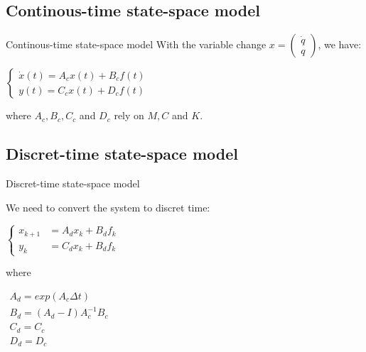 \documentclass{beamer}
\begin{document}
\subsection{Continous-time state-space model}
\begin{frame}{Continous-time state-space model}
With the variable change $x =
\begin{pmatrix}
\dot{q} \\
q
\end{pmatrix}$, we have:


\begin{center}
$\left\{
\begin{array}{ll}
\dot{x}(t) = A_cx(t) + B_cf(t) \\
y(t) = C_cx(t) + D_cf(t)
\end{array}
\right.$
\end{center}

where $A_c, B_c, C_c$ and $D_c$ rely on $M, C$ and $K$.

\end{frame}

\subsection{Discret-time state-space model}
\begin{frame}{Discret-time state-space model}

We need to convert the system to discret time:

\begin{center}

$\left\{
\begin{array}{ll}
x_{k+1} & = A_dx_k + B_df_k \\
y_k & = C_dx_k + B_df_k
\end{array}
\right.$


\end{center}

where

\begin{center}


$\begin{array}{ll}
A_d = exp(A_c \Delta t) \\
B_d= (A_d - I) A^{-1}_c B_c \\
C_d = C_c \\
D_d = D_c
\end{array}$

\end{center}


\end{frame}
\end{document}
